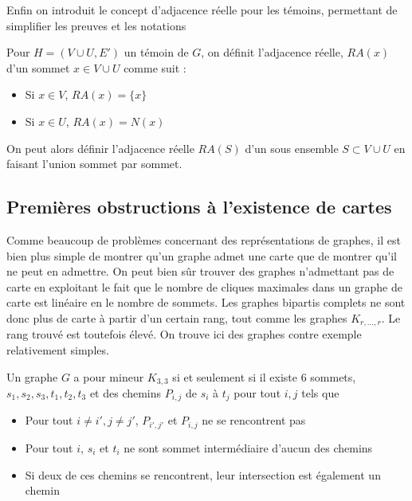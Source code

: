 \documentclass{scrartcl}
\begin{document}
\begin{flushleft}
Enfin on introduit le concept d'adjacence réelle pour les témoins, permettant de simplifier les preuves et les notations

\begin{def*}
    Pour $H = (V \cup U, E')$ un témoin de $G$, on définit l'adjacence réelle, $RA(x)$ d'un sommet $x \in V \cup U$ comme suit :
    \begin{itemize}
        \item Si $x \in V$, $RA(x) = \{x\}$
        \item Si $x \in U$, $RA(x) = N(x)$
    \end{itemize}
    On peut alors définir l'adjacence réelle $RA(S)$ d'un sous ensemble $S \subset V \cup U$ en faisant l'union sommet par sommet.
\end{def*}

\subsection{Premières obstructions à l'existence de cartes}

Comme beaucoup de problèmes concernant des représentations de graphes, il est bien plus simple de montrer qu'un graphe admet une
carte que de montrer qu'il ne peut en admettre. On peut bien sûr trouver des graphes n'admettant pas de carte en exploitant
le fait que le nombre de cliques maximales dans un graphe de carte est linéaire en le nombre de sommets. Les graphes bipartis
complets ne sont donc plus de carte à partir d'un certain rang, tout comme les graphes $K_{r,...,r}$. Le rang trouvé est toutefois
élevé. On trouve ici des graphes contre exemple relativement simples.

\begin{lem}\label{CNSK33}
    Un graphe $G$ a pour mineur $K_{3,3}$ si et seulement si il existe $6$ sommets, $s_1, s_2, s_3, t_1, t_2, t_3$ et des chemins
    $P_{i,j}$ de $s_i$ à $t_j$ pour tout $i, j$ tels que
    \begin{itemize}
        \item Pour tout $i \neq i', j \neq j'$, $P_{i',j'}$ et $P_{i, j}$ ne se rencontrent pas
        \item Pour tout $i$, $s_i$ et $t_i$ ne sont sommet intermédiaire d'aucun des chemins
        \item Si deux de ces chemins se rencontrent, leur intersection est également un chemin
    \end{itemize}
\end{lem}


\end{flushleft}
\end{document}
